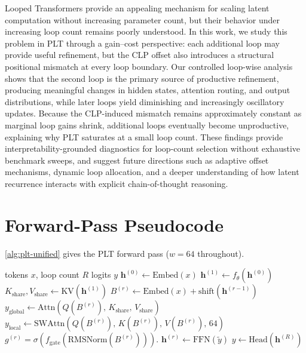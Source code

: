 \documentclass{llmxive}
\providecommand{\hidden}{\mathbf{h}}
\providecommand{\block}{f_\theta}
\providecommand{\loopcount}{R}
\begin{document}
Looped Transformers provide an appealing mechanism for scaling latent computation without increasing parameter count, but their behavior under increasing loop count remains poorly understood. In this work, we study this problem in PLT through a gain--cost perspective: each additional loop may provide useful refinement, but the CLP offset also introduces a structural positional mismatch at every loop boundary. Our controlled loop-wise analysis shows that the second loop is the primary source of productive refinement, producing meaningful changes in hidden states, attention routing, and output distributions, while later loops yield diminishing and increasingly oscillatory updates. Because the CLP-induced mismatch remains approximately constant as marginal loop gains shrink, additional loops eventually become unproductive, explaining why PLT saturates at a small loop count. These findings provide interpretability-grounded diagnostics for loop-count selection without exhaustive benchmark sweeps, and suggest future directions such as adaptive offset mechanisms, dynamic loop allocation, and a deeper understanding of how latent recurrence interacts with explicit chain-of-thought reasoning.







\appendix

\section{Forward-Pass Pseudocode}
\label{app:pseudocode}

\autoref{alg:plt-unified} gives the PLT forward pass ($w = 64$
throughout).

\begin{algorithm}[H]
\caption{PLT Forward Pass ($w=64$)}
\label{alg:plt-unified}
\begin{algorithmic}[1]
\Input tokens $x$, loop count $\loopcount$
\Output logits $y$
\State $\hidden^{(0)} \leftarrow \mathrm{Embed}(x)$
\For{$r = 1$ \textbf{to} $\loopcount$}
    \State $\hidden^{(1)} \leftarrow \block\!\left(\hidden^{(0)}\right)$
    \State $K_{\text{share}}, V_{\text{share}} \leftarrow \mathrm{KV}\!\left(\hidden^{(1)}\right)$
  \Else
    \State $B^{(r)} \leftarrow \mathrm{Embed}(x) + \mathrm{shift}\!\left(\hidden^{(r-1)}\right)$
    \State $y_{\text{global}} \leftarrow \mathrm{Attn}\!\left(Q(B^{(r)}),\, K_{\text{share}},\, V_{\text{share}}\right)$
    \State $y_{\text{local}} \leftarrow \mathrm{SWAttn}\!\left(Q(B^{(r)}),\, K(B^{(r)}),\, V(B^{(r)}),\, 64\right)$
    \State $g^{(r)} =
\sigma\!\left(f_{\mathrm{gate}}(\mathrm{RMSNorm}(B^{(r)}))\right).$
    \State $\hidden^{(r)} \leftarrow \mathrm{FFN}\!\left(\tilde{y}\right)$
  \EndIf
\EndFor
\State $y \leftarrow \mathrm{Head}\!\left(\hidden^{(\loopcount)}\right)$
\end{algorithmic}
\end{algorithm}
\end{document}
